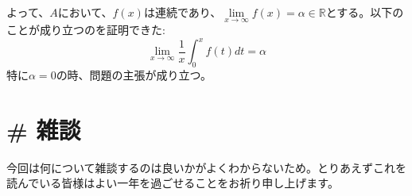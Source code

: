 \documentclass{jreport}
\begin{document}
よって、$A$において、$f(x)$は連続であり、$\lim\limits_{x \to \infty} f(x) = \alpha \in \mathbb{R}$とする。以下のことが成り立つのを証明できた:
$$
\lim_{x \to \infty} \frac{1}{x} \int_0^x f(t)dt = \alpha
$$
特に$\alpha =0 $の時、問題の主張が成り立つ。
\newpage
\section{\# 雑談}
今回は何について雑談するのは良いかがよくわからないため。とりあえずこれを読んでいる皆様はよい一年を過ごせることをお祈り申し上げます。
\end{document}
